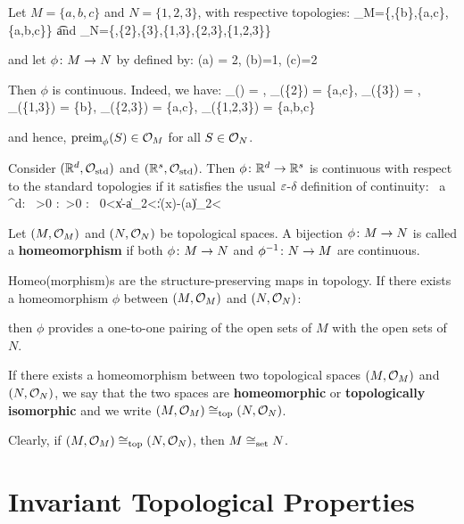 \be
Let $M = \{a,b,c\}$ and $N=\{1,2,3\}$, with respective topologies:
\bse
\cO_M=\{\vn,\{b\},\{a,c\},\{a,b,c\}\} \quad \t{and} \quad \cO_N=\{\vn,\{2\},\{3\},\{1,3\},\{2,3\},\{1,2,3\}\}
\ese

and let $\phi\colon M \to N$ by defined by:
\bse
\phi(a) = 2, \quad \phi(b)=1, \quad \phi(c)=2
\ese

Then $\phi$ is continuous. Indeed, we have:
\bse
{}_\phi(\vn) = \vn, \:\:\: _\phi(\{2\}) = \{a,c\}, \:\:\: _\phi(\{3\}) = \vn,
\:\:\: _\phi(\{1,3\}) = \{b\},
\ese
\bse
{}_\phi(\{2,3\}) = \{a,c\}, \:\:\: _\phi(\{1,2,3\}) = \{a,b,c\}
\ese

and hence, $\mathrm{preim}_\phi(S) \in \mathcal{O}_M$ for all $S \in \mathcal{O}_N$.
\ee

\be
Consider $(\mathbb{R}^d,\mathcal{O}_\mathrm{std})$ and $(\mathbb{R}^s,\mathcal{O}_\mathrm{std})$. Then $\phi \colon \mathbb{R}^d\to\mathbb{R}^s$ is continuous with
respect to the standard topologies if it satisfies the usual $\varepsilon$-$\delta$ definition of continuity:
\bse
\forall \, a \in \R^d: \forall \, \ve >0 :\exists \, \delta >0 : \forall \, 0<\|x-a\|_2<\delta:\|\phi(x)-\phi(a)\|_2<\ve
\ese
\ee

\bd [Homeomorphism]
Let $(M,\mathcal{O}_M)$ and $(N,\mathcal{O}_N)$ be topological spaces. A bijection $\phi\colon M\to N$ is called a
\textbf{homeomorphism} if both $\phi\colon M\to N$ and $\phi^{-1}\colon N\to M$ are continuous.
\ed

Homeo(morphism)s are the structure-preserving maps in topology. If there exists a homeomorphism $\phi$ between $(M,
\mathcal{O}_M)$ and $(N,\mathcal{O}_N)$:

\bse
{}
\ese

then $\phi$ provides a one-to-one pairing of the open sets of $M$ with the open sets of $N$.

If there exists a homeomorphism between two topological spaces $(M,\mathcal{O}_M)$ and $(N,\mathcal{O}_N)$, we say that the two
spaces are \textbf{homeomorphic} or \textbf{topologically isomorphic} and we write $(M,\mathcal{O}_M) \cong_\mathrm{top} (N,
\mathcal{O}_N)$.
\ed

Clearly, if $(M,\mathcal{O}_M) \cong_\mathrm{top} (N,\mathcal{O}_N)$, then $M \cong_\mathrm{set} N$.

\section{Invariant Topological Properties}

